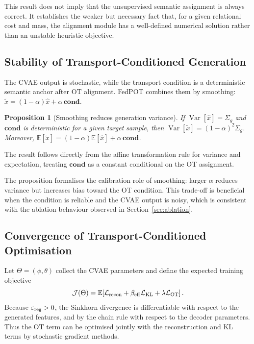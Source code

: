 \documentclass[a4paper,fleqn]{cas-sc}
\newtheorem{proposition}{Proposition}
\begin{document}
This result does not imply that the unsupervised semantic assignment is always
correct. It establishes the weaker but necessary fact that, for a given
relational cost and mass, the alignment module has a well-defined numerical
solution rather than an unstable heuristic objective.

\subsection{Stability of Transport-Conditioned Generation}

The CVAE output is stochastic, while the transport condition is a deterministic
semantic anchor after OT alignment. FedPOT combines them by smoothing:
$\tilde x=(1-\alpha)\hat x+\alpha\,\mathbf{cond}$.

\begin{proposition}[Smoothing reduces generation variance]
  If $\operatorname{Var}[\hat x]=\Sigma_g$ and $\mathbf{cond}$ is deterministic
  for a given target sample, then
  $\operatorname{Var}[\tilde x]=(1-\alpha)^2\Sigma_g$.
  Moreover,
  $\mathbb{E}[\tilde x]=(1-\alpha)\mathbb{E}[\hat x]
  +\alpha\,\mathbf{cond}$.
  \label{prop:smooth_theory}
\end{proposition}

\begin{pf}
  The result follows directly from the affine transformation rule for
  variance and expectation, treating $\mathbf{cond}$ as a constant conditional
  on the OT assignment.
\end{pf}

The proposition formalises the calibration role of smoothing: larger
$\alpha$ reduces variance but increases bias toward the OT condition. This
trade-off is beneficial when the condition is reliable and the CVAE output is
noisy, which is consistent with the ablation behaviour observed in
Section~\ref{sec:ablation}.

\subsection{Convergence of Transport-Conditioned Optimisation}

Let $\Theta=(\phi,\theta)$ collect the CVAE parameters and define the expected
training objective
\begin{equation}
  \mathcal{J}(\Theta)
  = \mathbb{E}\!\left[
    \mathcal{L}_{\rm recon}
    + \beta_{\rm eff}\mathcal{L}_{\rm KL}
    + \lambda\mathcal{L}_{\rm OT}
  \right].
  \label{eq:expected_obj}
\end{equation}
Because $\varepsilon_{\rm reg}>0$, the Sinkhorn divergence is differentiable
with respect to the generated features, and by the chain rule with respect to
the decoder parameters. Thus the OT term can be optimised jointly with the
reconstruction and KL terms by stochastic gradient methods.
\end{document}
